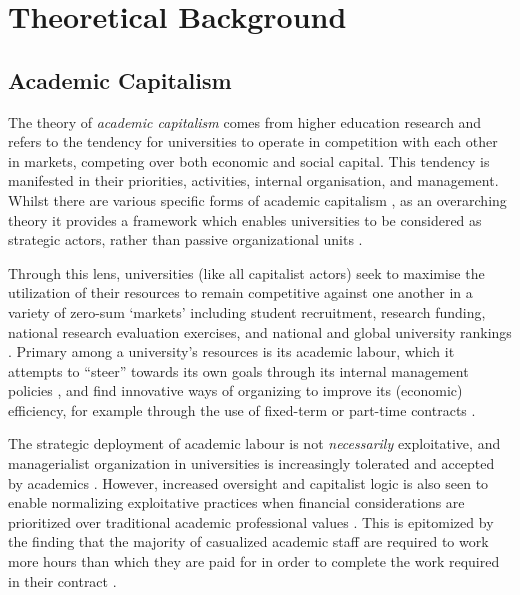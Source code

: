 \documentclass[meta, authordate]{jote-new-article}
\begin{document}
\section{Theoretical Background}



\subsection{Academic Capitalism}



The theory of \emph{academic capitalism} comes from higher education research and refers to the tendency for universities to operate in competition with each other in markets, competing over both economic and social capital. This tendency is manifested in their priorities, activities, internal organisation, and management. Whilst there are various specific forms of academic capitalism \parencites{Jessop2018}, as an overarching theory it provides a framework which enables universities to be considered as strategic actors, rather than passive organizational units \parencites{Münch2014}.



Through this lens, universities (like all capitalist actors) seek to maximise the utilization of their resources to remain competitive against one another in a variety of zero-sum ‘markets’ including student recruitment, research funding, national research evaluation exercises, and national and global university rankings \parencites{Collini2012}. Primary among a university’s resources is its academic labour, which it attempts to “steer” towards its own goals through its internal management policies \parencites{Rees2015}, and find innovative ways of organizing to improve its (economic) efficiency, for example through the use of fixed-term or part-time contracts \parencites{Macfarlane2011}.



The strategic deployment of academic labour is not \emph{necessarily} exploitative, and managerialist organization in universities is increasingly tolerated and accepted by academics \parencites{Kolsaker2008}. However, increased oversight and capitalist logic is also seen to enable normalizing exploitative practices when financial considerations are prioritized over traditional academic professional values \parencites{Vican2020}. This is epitomized by the finding that the majority of casualized academic staff are required to work more hours than which they are paid for in order to complete the work required in their contract \parencites[i.e., marking essays to a suitable academic standard][]{University2019}.
\end{document}
